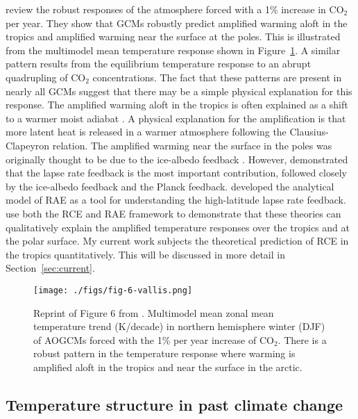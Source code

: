 \documentclass{article}
\begin{document}
\citet{vallis-et-al-2015} review the robust responses of the atmosphere forced with a 1\% increase in CO$_2$ per year. They show that GCMs robustly predict amplified warming aloft in the tropics and amplified warming near the surface at the poles. This is illustrated from the multimodel mean temperature response shown in Figure~\ref{fig:fig-6-vallis}. A similar pattern results from the equilibrium temperature response to an abrupt quadrupling of CO$_2$ concentrations. The fact that these patterns are present in nearly all GCMs suggest that there may be a simple physical explanation for this response. The amplified warming aloft in the tropics is often explained as a shift to a warmer moist adiabat \citep{po-chedley-and-fu-2012}. A physical explanation for the amplification is that more latent heat is released in a warmer atmosphere following the Clausius-Clapeyron relation. The amplified warming near the surface in the poles was originally thought to be due to the ice-albedo feedback \citep{manabe-wetherald-1975}. However, \citet{pithan-mauritsen-2014} demonstrated that the lapse rate feedback is the most important contribution, followed closely by the ice-albedo feedback and the Planck feedback. \citet{cronin-jansen-2016} developed the analytical model of RAE as a tool for understanding the high-latitude lapse rate feedback. \citet{payne-et-al-2015} use both the RCE and RAE framework to demonstrate that these theories can qualitatively explain the amplified temperature responses over the tropics and at the polar surface. My current work subjects the theoretical prediction of RCE in the tropics quantitatively. This will be discussed in more detail in Section~\ref{sec:current}.

\begin{figure}
\centering
\texttt{[image: ./figs/fig-6-vallis.png]}
\caption{Reprint of Figure 6 from \citet{vallis-et-al-2015}. Multimodel mean zonal mean temperature trend (K/decade) in northern hemisphere winter (DJF) of AOGCMs forced with the 1\% per year increase of CO$_2$. There is a robust pattern in the temperature response where warming is amplified aloft in the tropics and near the surface in the arctic.}
\label{fig:fig-6-vallis}
\end{figure}

\subsection{Temperature structure in past climate change} \label{subsec:past}
\end{document}
